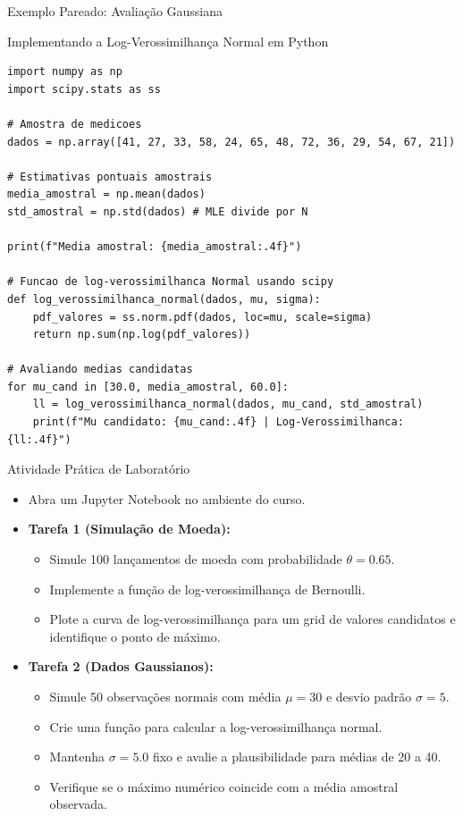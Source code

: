 \begin{frame}[fragile]{Exemplo Pareado: Avaliação Gaussiana}
    \begin{block}{Implementando a Log-Verossimilhança Normal em Python}
\begin{lstlisting}
import numpy as np
import scipy.stats as ss

# Amostra de medicoes
dados = np.array([41, 27, 33, 58, 24, 65, 48, 72, 36, 29, 54, 67, 21])

# Estimativas pontuais amostrais
media_amostral = np.mean(dados)
std_amostral = np.std(dados) # MLE divide por N

print(f"Media amostral: {media_amostral:.4f}")

# Funcao de log-verossimilhanca Normal usando scipy
def log_verossimilhanca_normal(dados, mu, sigma):
    pdf_valores = ss.norm.pdf(dados, loc=mu, scale=sigma)
    return np.sum(np.log(pdf_valores))

# Avaliando medias candidatas
for mu_cand in [30.0, media_amostral, 60.0]:
    ll = log_verossimilhanca_normal(dados, mu_cand, std_amostral)
    print(f"Mu candidato: {mu_cand:.4f} | Log-Verossimilhanca: {ll:.4f}")
\end{lstlisting}
    \end{block}
\end{frame}

\begin{frame}{Atividade Prática de Laboratório}
    \begin{itemize}
        \item Abra um Jupyter Notebook no ambiente do curso.
        \item \textbf{Tarefa 1 (Simulação de Moeda):}
        \begin{itemize}
            \item Simule 100 lançamentos de moeda com probabilidade $\theta = 0.65$.
            \item Implemente a função de log-verossimilhança de Bernoulli.
            \item Plote a curva de log-verossimilhança para um grid de valores candidatos e identifique o ponto de máximo.
        \end{itemize}
        \item \textbf{Tarefa 2 (Dados Gaussianos):}
        \begin{itemize}
            \item Simule 50 observações normais com média $\mu = 30$ e desvio padrão $\sigma = 5$.
            \item Crie uma função para calcular a log-verossimilhança normal.
            \item Mantenha $\sigma = 5.0$ fixo e avalie a plausibilidade para médias de 20 a 40.
            \item Verifique se o máximo numérico coincide com a média amostral observada.
        \end{itemize}
    \end{itemize}
\end{frame}
